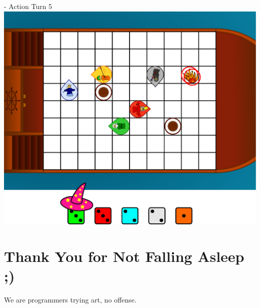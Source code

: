 \documentclass[presentation]{beamer}
\begin{document}
\begin{frame}{\insertsection - Action Turn 5}
	\center
	\includegraphics[width=\textheight]{ingame_sketch_5.pdf}
\end{frame}

\section{Thank You for Not Falling Asleep ;)}

\begin{frame}{\insertsection}
	We are programmers trying art, no offense.
\end{frame}
\end{document}

